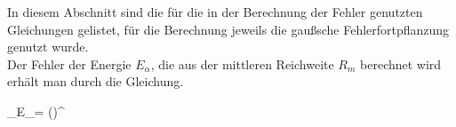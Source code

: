 In diesem Abschnitt sind die für die in der Berechnung der Fehler
genutzten Gleichungen gelistet, für die Berechnung jeweils die 
gaußsche Fehlerfortpflanzung genutzt wurde.\\

Der Fehler der Energie $E_{\alpha}$, die aus der mittleren Reichweite $R_{m}$ 
berechnet wird erhält man durch die Gleichung.
\begin{errorEquation}
	\sigma_{E_{\alpha}}=  \big(\big)^{}
	\label{std:Energie}
\end{errorEquation}   